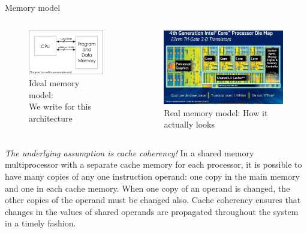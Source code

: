 \documentclass[10pt,times]{beamer}
\begin{document}
\begin{frame}{Memory model}
\begin{columns}
\begin{figure}
\includegraphics[width=.7\linewidth]{figs/ideal_memory_model}
\caption*{Ideal memory model: \\ We write for this architecture}
\end{figure}

\begin{figure}
\includegraphics[width=0.9\linewidth]{figs/real_memory_model}
\caption*{Real memory model: How it actually looks}
\end{figure}
\end{columns}

\centering
\textit{The underlying assumption is cache coherency!}
\flushleft
\small
In a shared memory multiprocessor with a separate cache memory for each 
processor, it is possible to have many copies of any one instruction 
operand: one 
copy in the main memory and one in each cache memory. When one copy of an 
operand is 
changed, the other copies of the operand must be changed also. Cache 
coherency 
ensures that changes in the values of shared operands are propagated 
throughout the 
system in a timely fashion.
\end{frame}
\end{document}
